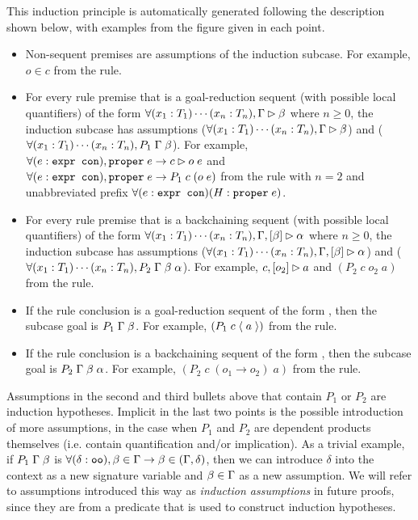 This induction principle is automatically generated following the description shown below, with examples from the figure given in each point.
\begin{itemize}
 \item Non-sequent premises are assumptions of the induction subcase. For example, $o \in c$ from the \rlnmsinit{} rule.
 \item For every rule premise that is a goal-reduction sequent (with possible local quantifiers) of the form $\forall (x_1 : T_1) \cdots (x_n : T_n), \seqsl{\beta}$ where $n \geq 0$, the induction subcase has assumptions ($\forall (x_1 : T_1) \cdots (x_n : T_n), \seqsl{\beta}$) and ($\forall (x_1 : T_1) \cdots (x_n : T_n), P_1 \; \dyncon{} \; \beta$). For example, $\forall (e : \sltm{expr con}), \sltm{proper} \; e \rightarrow \seqsl[c]{o \; e}$ and $\forall (e : \sltm{expr con}), \sltm{proper} \; e \rightarrow P_1 \; c \; (o \; e)$ from the \rlnmsall{} rule with $n = 2$ and unabbreviated prefix $\forall (e : \sltm{expr con}) (H : \sltm{proper} \; e)$.
 \item For every rule premise that is a backchaining sequent (with possible local quantifiers) of the form $\forall (x_1 : T_1) \cdots (x_n : T_n), \bchsl{\beta}{\alpha}$ where $n \geq 0$, the induction subcase has assumptions ($\forall (x_1 : T_1) \cdots (x_n : T_n), \bchsl{\beta}{\alpha}$) and ($\forall (x_1 : T_1) \cdots (x_n : T_n), P_2 \; \dyncon{} \; \beta \; \alpha$). For example, $\bchsl[c]{o_2}{a}$ and $(P_2 \; c \; o_2 \; a)$ from the \rlnmbimp{} rule.
 \item If the rule conclusion is a goal-reduction sequent of the form \seqsl{\beta}, then the subcase goal is $P_1 \; \dyncon{} \; \beta$. For example, $(P_1 \; c \; \atom{a})$ from the \rlnmsinit{} rule.
 \item If the rule conclusion is a backchaining sequent of the form \bchsl{\beta}{\alpha}, then the subcase goal is $P_2 \; \dyncon{} \; \beta \; \alpha$. For example, $(P_2 \; c \; (o_1 \longrightarrow o_2) \; a)$ from the \rlnmbimp{} rule.
\end{itemize}
Assumptions in the second and third bullets above that contain $P_1$ or $P_2$ are induction hypotheses. Implicit in the last two points is the possible introduction of more assumptions, in the case when $P_1$ and $P_2$ are dependent products themselves (i.e. contain quantification and/or implication). As a trivial example, if $P_1 \; \dyncon{} \; \beta$ is $\forall (\delta : \sltm{oo}), \beta \in \dyncon{} \rightarrow \beta \in (\dyncon{} , \delta)$, then we can introduce $\delta$ into the context as a new signature variable and $\beta \in \dyncon{}$ as a new assumption.
We will refer to assumptions introduced this way as \emph{induction assumptions} in future proofs, since they are from a predicate that is used to construct induction hypotheses.

